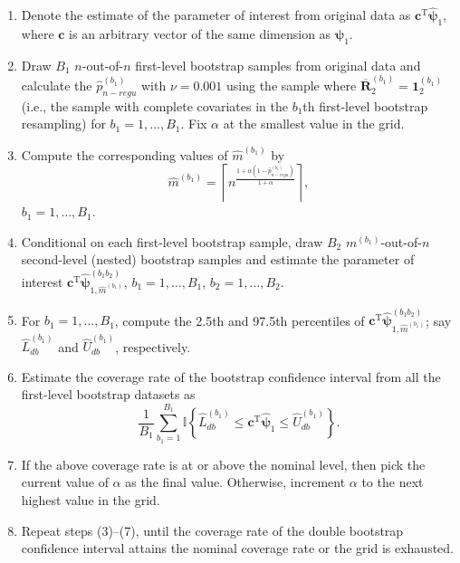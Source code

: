 \documentclass[12pt]{article}
\begin{document}
\begin{enumerate}
    \item Denote the estimate of the parameter of interest from original data as $\bm{c}^{\mathrm{T}} \widehat{\bm{\psi}}_1$, where $\bm{c}$ is an arbitrary vector of the same dimension as $\bm{\psi}_1$.
    \item Draw $B_1$ $n$-out-of-$n$ first-level bootstrap samples from original  data and calculate the $\widehat{p}_{n-regu}^{(b_1)}$ with $\nu=0.001$ using the sample where $\overline{\bm{R}}_2^{(b_1)} = \bm{1}_2^{(b_1)}$ (i.e., the sample with complete covariates in the $b_1$th first-level bootstrap resampling)  %
    for $b_1 = 1,\ldots,B_1$. Fix $\alpha$ at the smallest value in the grid.
    \item Compute the corresponding values of $\widehat{m}^{(b_1)}$ by $$
    \widehat{m}^{(b_1)} = \left\lceil n^{\frac{1+\alpha\left(1-\widehat{p}_{n-regu}^{(b_1)}\right)}{1+\alpha}} \right\rceil,
    $$
     $b_1 = 1,\ldots,B_1$. 
    \item Conditional on each first-level bootstrap sample, draw $B_2$ $m^{(b_1)}$-out-of-$n$ second-level (nested) bootstrap samples and estimate the parameter of interest $\bm{c}^{\mathrm{T}} \widehat{\bm{\psi}}^{(b_1b_2)}_{1,\widehat{m}^{(b_1)}}$, $b_1 = 1,\ldots,B_1$, $b_2 = 1,\ldots,B_2$.
    \item For $b_1=1,...,B_1$, compute the 2.5th and 97.5th percentiles of $\bm{c}^{\mathrm{T}} \widehat{\bm{\psi}}^{(b_1b_2)}_{1,\widehat{m}^{(b_1)}}$; say $\widehat{L}_{db}^{(b_1)}$ and $\widehat{U}_{db}^{(b_1)}$, respectively. %
    \item Estimate the coverage rate of the bootstrap confidence interval from all the first-level bootstrap datasets as
    $$
    \frac{1}{B_1} \sum_{b_1=1}^{B_1} \mathbb{I} \left\{ 
    \widehat{L}_{db}^{(b_1)} \leq \bm{c}^{\mathrm{T}} \widehat{\bm{\psi}}_1 \leq \widehat{U}_{db}^{(b_1)}
    \right\}.
    $$
    \item  If the above coverage rate is at or above the nominal
    level, then pick the current value of $\alpha$ as the final value. Otherwise, increment $\alpha$ to the next highest value in the grid.
    \item Repeat steps (3)–(7), until the coverage rate of the double bootstrap confidence interval attains the nominal coverage rate or the grid is exhausted.
\end{enumerate}
\end{document}
